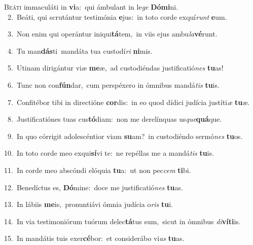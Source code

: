 \lettrine{\initial\textcolor{\initialcolor}{B}}{eáti} immaculáti in \textbf{vi}\-a:~\star qui ámbulant in le\textit{ge} \textbf{Dó}\-\textbf{mi}ni.\\
{\numbfont\textcolor{\numbcolor}{~2.}}~Beáti, qui scrutántur testimónia \textbf{e}\-jus:~\star in toto corde exquí\textit{runt} \textbf{e}\-um.\par
{\numbfont\textcolor{\numbcolor}{~3.}}~Non enim qui operántur iniqui\-\textbf{tá}\-tem,~\star in viis ejus ambu\-\textit{la}\-\textbf{vé}runt.\par
{\numbfont\textcolor{\numbcolor}{~4.}}~Tu man\-\textbf{dás}\-ti~\star mandáta tua custodí\textit{ri} \textbf{ni}\-mis.\par
{\numbfont\textcolor{\numbcolor}{~5.}}~Utinam dirigántur viæ \textbf{me}\-æ,~\star ad custodiéndas justificatió\textit{nes} \textbf{tu}\-as!\par
{\numbfont\textcolor{\numbcolor}{~6.}}~Tunc non con\-\textbf{fún}\-dar,~\star cum perspéxero in ómnibus mandá\textit{tis} \textbf{tu}\-is.\par
{\numbfont\textcolor{\numbcolor}{~7.}}~Confitébor tibi in directióne \textbf{cor}\-dis:~\star in eo quod dídici judícia justíti\textit{æ} \textbf{tu}\-æ.\par
{\numbfont\textcolor{\numbcolor}{~8.}}~Justificatiónes tuas cus\-\textbf{tó}\-diam:~\star non me derelínquas us\-\textit{que}\-\textbf{quá}que.\par
{\numbfont\textcolor{\numbcolor}{~9.}}~In quo córrigit adolescéntior viam \textbf{su}\-am?~\star in custodiéndo sermó\textit{nes} \textbf{tu}\-os.\par
{\numbfont\textcolor{\numbcolor}{10.}}~In toto corde meo exqui\-\textbf{sí}\-vi te:~\star ne repéllas me a mandá\textit{tis} \textbf{tu}\-is.\par
{\numbfont\textcolor{\numbcolor}{11.}}~In corde meo abscóndi elóquia \textbf{tu}\-a:~\star ut non pec\textit{cem} \textbf{ti}\-bi.\par
{\numbfont\textcolor{\numbcolor}{12.}}~Benedíctus es, \textbf{Dó}\-mine:~\star doce me justificatió\textit{nes} \textbf{tu}\-as.\par
{\numbfont\textcolor{\numbcolor}{13.}}~In lábiis \textbf{me}\-is,~\star pronuntiávi ómnia judícia o\textit{ris} \textbf{tu}\-i.\par
{\numbfont\textcolor{\numbcolor}{14.}}~In via testimoniórum tuórum delec\-\textbf{tá}\-tus sum,~\star sicut in ómnibus \textit{di}\-\textbf{ví}\textbf{ti}is.\par
{\numbfont\textcolor{\numbcolor}{15.}}~In mandátis tuis exer\-\textbf{cé}\-bor:~\star et considerábo vi\textit{as} \textbf{tu}\-as.\par
